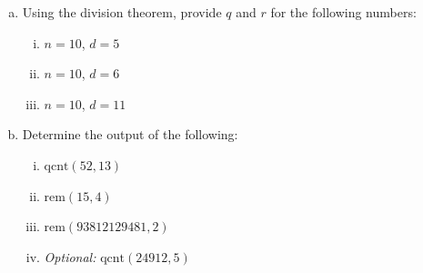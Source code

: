 \documentclass[12pt,letterpaper]{article}
\begin{document}
	\begin{enumerate}[a.]
	    \item Using the division theorem, provide $q$ and $r$ for the following numbers:
	    
	    \begin{enumerate}[i.]
	        \item $n = 10$, $d = 5$
	        \begin{mdframed} \vspace{0.5cm} \end{mdframed}
	        
	        \item $n = 10$, $d = 6$
	        \begin{mdframed} \vspace{0.5cm} \end{mdframed}
	        
	        \item $n = 10$, $d = 11$
	        \begin{mdframed} \vspace{0.5cm} \end{mdframed}
	    \end{enumerate}
	    
	    \item Determine the output of the following:
	    
	    \begin{enumerate}[i.]
	        \item  $\text{qcnt}(52,13)$  %
	       \begin{mdframed} \vspace{0.5cm} \end{mdframed}
	        
	        \item  $\text{rem}(15,4)$  %
	        \begin{mdframed} \vspace{0.5cm} \end{mdframed}
	        
	        \item  $\text{rem}(93812129481,2)$
	        \begin{mdframed} \vspace{0.5cm} \end{mdframed}
	        
	        \item  \textit{Optional:} $\text{qcnt}(24912,5)$  %
	       \begin{mdframed} \vspace{0.5cm} \end{mdframed}
	    \end{enumerate}
	    

\end{enumerate}
\end{document}
